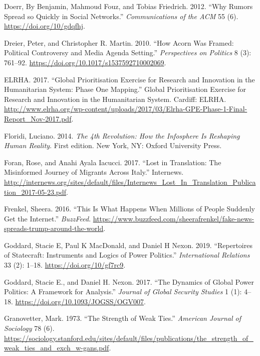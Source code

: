 \begin{cslreferences}
\leavevmode\hypertarget{ref-Doerr2012Why}{}%
Doerr, By Benjamin, Mahmoud Fouz, and Tobias Friedrich. 2012. ``Why
Rumors Spread so Quickly in Social Networks.'' \emph{Communications of
the ACM} 55 (6). \url{https://doi.org/10/gdqfhj}.

\leavevmode\hypertarget{ref-Dreier2010How}{}%
Dreier, Peter, and Christopher R. Martin. 2010. ``How Acorn Was Framed:
Political Controversy and Media Agenda Setting.'' \emph{Perspectives on
Politics} 8 (3): 761--92.
\url{https://doi.org/10.1017/s1537592710002069}.

\leavevmode\hypertarget{ref-ELRHA2017Global}{}%
ELRHA. 2017. ``Global Prioritisation Exercise for Research and
Innovation in the Humanitarian System: Phase One Mapping.'' Global
Prioritisation Exercise for Research and Innovation in the Humanitarian
System. Cardiff: ELRHA.
\url{http://www.elrha.org/wp-content/uploads/2017/03/Elrha-GPE-Phase-1-Final-Report_Nov-2017.pdf}.

\leavevmode\hypertarget{ref-Floridi20144th}{}%
Floridi, Luciano. 2014. \emph{The 4th Revolution: How the Infosphere Is
Reshaping Human Reality}. First edition. New York, NY: Oxford University
Press.

\leavevmode\hypertarget{ref-Foran2017Lost}{}%
Foran, Rose, and Anahi Ayala Iacucci. 2017. ``Lost in Translation: The
Misinformed Journey of Migrants Across Italy.'' Internews.
\url{http://internews.org/sites/default/files/Internews_Lost_In_Translation_Publication_2017-05-23.pdf}.

\leavevmode\hypertarget{ref-Frenkel2016This}{}%
Frenkel, Sheera. 2016. ``This Is What Happens When Millions of People
Suddenly Get the Internet.'' \emph{BuzzFeed}.
\url{https://www.buzzfeed.com/sheerafrenkel/fake-news-spreads-trump-around-the-world}.

\leavevmode\hypertarget{ref-Goddard2019Repertoires}{}%
Goddard, Stacie E, Paul K MacDonald, and Daniel H Nexon. 2019.
``Repertoires of Statecraft: Instruments and Logics of Power Politics.''
\emph{International Relations} 33 (2): 1--18.
\url{https://doi.org/10/gf7rc9}.

\leavevmode\hypertarget{ref-Goddard2017Dynamics}{}%
Goddard, Stacie E., and Daniel H. Nexon. 2017. ``The Dynamics of Global
Power Politics: A Framework for Analysis.'' \emph{Journal of Global
Security Studies} 1 (1): 4--18.
\url{https://doi.org/10.1093/JOGSS/OGV007}.

\leavevmode\hypertarget{ref-Granovetter1973Strength}{}%
Granovetter, Mark. 1973. ``The Strength of Weak Ties.'' \emph{American
Journal of Sociology} 78 (6).
\url{https://sociology.stanford.edu/sites/default/files/publications/the_strength_of_weak_ties_and_exch_w-gans.pdf}.


\end{cslreferences}
